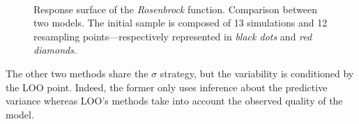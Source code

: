\begin{figure}[!ht]               
\centering
{}
 ~       
\caption{Response surface of the \textit{Rosenbrock} function. Comparison between two models. The initial sample is composed of 13 simulations and 12 resampling points---respectively represented in \emph{black dots} and \emph{red diamonds}.}
\label{fig:methods-rosenbrock-nofit}
\end{figure}

The other two methods share the $\sigma$ strategy, but the variability is conditioned by the LOO point. Indeed, the former only uses inference about the predictive variance whereas LOO's methods take into account the observed quality of the model.

